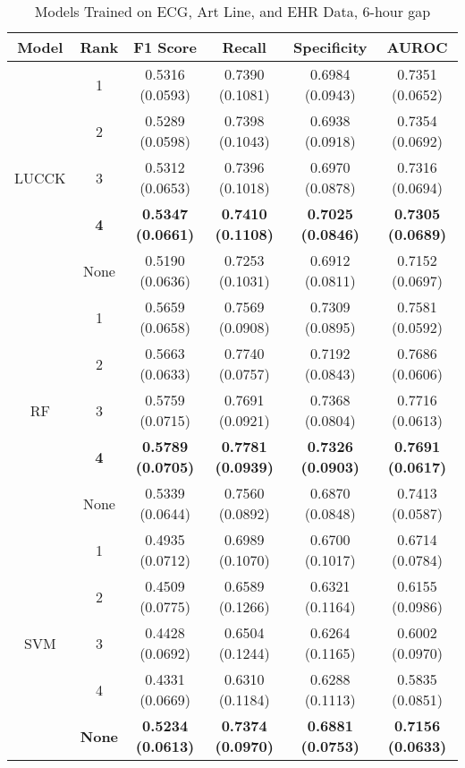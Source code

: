 \begin{table}
    \centering
    \caption{Models Trained on ECG, Art Line, and EHR Data, 6-hour gap}
    \begin{tabular}{|c|c|c|c|c|c|}
        \hline
        Model & Rank & F1 Score & Recall & Specificity & AUROC \\
        \hline
        & 1 & 0.5316 (0.0593) & 0.7390 (0.1081) & 0.6984 (0.0943) & 0.7351 (0.0652)\\
        & 2 & 0.5289 (0.0598) & 0.7398 (0.1043) & 0.6938 (0.0918) & 0.7354 (0.0692)\\
        LUCCK & 3 & 0.5312 (0.0653) & 0.7396 (0.1018) & 0.6970 (0.0878) & 0.7316 (0.0694)\\
        & \textbf{4} & \textbf{0.5347 (0.0661)} & \textbf{0.7410 (0.1108)} & \textbf{0.7025 (0.0846)} & \textbf{0.7305 (0.0689)}\\
        & None & 0.5190 (0.0636) & 0.7253 (0.1031) & 0.6912 (0.0811) & 0.7152 (0.0697)\\
        \hline
        & 1 & 0.5659 (0.0658) & 0.7569 (0.0908) & 0.7309 (0.0895) & 0.7581 (0.0592)\\
        & 2 & 0.5663 (0.0633) & 0.7740 (0.0757) & 0.7192 (0.0843) & 0.7686 (0.0606)\\
        RF & 3 & 0.5759 (0.0715) & 0.7691 (0.0921) & 0.7368 (0.0804) & 0.7716 (0.0613)\\
        & \textbf{4} & \textbf{0.5789 (0.0705)} & \textbf{0.7781 (0.0939)} & \textbf{0.7326 (0.0903)} & \textbf{0.7691 (0.0617)}\\
        & None & 0.5339 (0.0644) & 0.7560 (0.0892) & 0.6870 (0.0848) & 0.7413 (0.0587)\\
        \hline
        & 1 & 0.4935 (0.0712) & 0.6989 (0.1070) & 0.6700 (0.1017) & 0.6714 (0.0784)\\
        & 2 & 0.4509 (0.0775) & 0.6589 (0.1266) & 0.6321 (0.1164) & 0.6155 (0.0986)\\
        SVM & 3 & 0.4428 (0.0692) & 0.6504 (0.1244) & 0.6264 (0.1165) & 0.6002 (0.0970)\\
        & 4 & 0.4331 (0.0669) & 0.6310 (0.1184) & 0.6288 (0.1113) & 0.5835 (0.0851)\\
        & \textbf{None} & \textbf{0.5234 (0.0613)} & \textbf{0.7374 (0.0970)} & \textbf{0.6881 (0.0753)} & \textbf{0.7156 (0.0633)}\\
        \hline
    \end{tabular}
\end{table}

